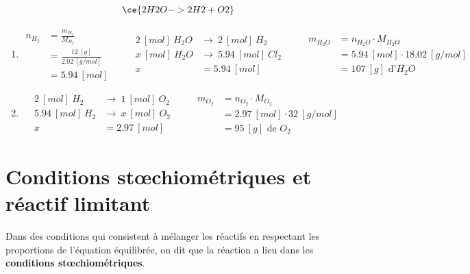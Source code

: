 \documentclass[
  11pt,
  a4paper,
  openany]{book}
\begin{document}
\begin{Answer}

\[ \ce{2 H2O -> 2 H2 + O2} \]

\begin{enumerate}
\def\labelenumi{\arabic{enumi}.}
\item
  \[ \begin{split}
    n_{H_{2}} &= \frac{m_{H_{2}}}{M_{H_{2}}} \\
    &= \frac{12\ [g]}{2.02\ [g/mol]} \\
    &= 5.94\ [mol]
    \end{split}
    \qquad
    \begin{split}
    2\ [mol]\ H_2O &\rightarrow\ 2\ [mol]\ H_2 \\
    x\ [mol]\ H_2O &\rightarrow\ 5.94\ [mol]\ Cl_2 \\
    x &= 5.94\ [mol]
    \end{split}
    \qquad
    \begin{split}
    m_{H_2O} &= n_{H_2O} \cdot M_{H_2O} \\
    &= 5.94\ [mol] \cdot 18.02\ [g/mol] \\
    &= 107\ [g] \text{ d'} H_2O
    \end{split} \]
\item
  \[ \begin{split}
    2\ [mol]\ H_2 &\rightarrow\ 1\ [mol]\ O_2 \\
    5.94\ [mol]\ H_2 &\rightarrow\ x\ [mol]\ O_2 \\
    x &= 2.97\ [mol]
    \end{split}
    \qquad
    \begin{split}
    m_{O_2} &= n_{O_2} \cdot M_{O_2} \\
    &= 2.97\ [mol] \cdot 32\ [g/mol] \\
    &= 95\ [g] \text{ de } O_2
    \end{split} \]
\end{enumerate}

\end{Answer}

\hypertarget{conditions-stux153chiomuxe9triques-et-ruxe9actif-limitant}{%
\section{Conditions stœchiométriques et réactif limitant}\label{conditions-stux153chiomuxe9triques-et-ruxe9actif-limitant}}

Dans des conditions qui consistent à mélanger les réactifs en respectant les proportions de l'équation équilibrée, on dit que la réaction a lieu dans les \textbf{conditions stœchiométriques}.
\end{document}
